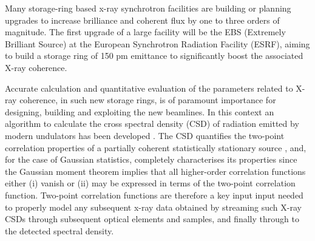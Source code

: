 \documentclass{iucr}              %
\begin{document}
Many storage-ring based x-ray synchrotron facilities are building or planning upgrades to increase brilliance and coherent flux by one to three orders of magnitude.  The first upgrade of a large facility will be the EBS (Extremely Brilliant Source) \cite{orangebook} at the European Synchrotron Radiation Facility (ESRF), aiming to build a storage ring of 150 pm emittance to significantly boost the associated X-ray coherence.

Accurate calculation and quantitative evaluation of the parameters related to X-ray coherence, in such new storage rings, is of paramount importance for designing, building and exploiting the new beamlines. In this context an algorithm to calculate the cross spectral density (CSD) of radiation emitted by modern undulators has been developed \cite{glass}.  The CSD quantifies the two-point correlation properties of a partially coherent statistically stationary source \cite{Wolf1982,mandel_wolf}, and, for the case of Gaussian statistics, completely characterises its properties since the Gaussian moment theorem implies that all higher-order correlation functions either (i) vanish or (ii) may be expressed in terms of the two-point correlation function.  Two-point correlation functions are therefore a key input input needed to properly model any subsequent x-ray data obtained by streaming such X-ray CSDs through subsequent optical elements and samples, and finally through to the detected spectral density.  
\end{document}
